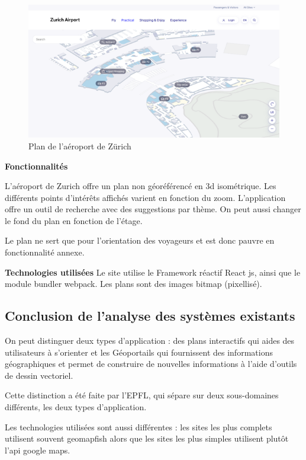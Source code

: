 \documentclass[
    iai, %
    il, %
]{heig-tb}
\begin{document}
\begin{figure}[h]
    \centering
    \includegraphics[scale=0.7]{planZurichAirport.png}
    \caption{Plan de l'aéroport de Zürich}
\end{figure}

\textbf{Fonctionnalités}

L'aéroport de Zurich \cite{zurich-aeroport} offre un plan non géoréférencé en 3d isométrique.
Les différents points d'intérêts affichés varient en fonction du zoom.
L'application offre un outil de recherche avec des suggestions par thème.
On peut aussi changer le fond du plan en fonction de l'étage.

Le plan ne sert que pour l'orientation des voyageurs et est donc pauvre en fonctionnalité annexe.

\textbf{Technologies utilisées}
Le site utilise le Framework réactif React js, ainsi que le module bundler webpack.  Les plans sont des images bitmap (pixellisé).

\subsection{Conclusion de l'analyse des systèmes existants}
On peut distinguer deux types d'application :
des plans interactifs qui aides des utilisateurs à s'orienter et les Géoportails qui fournissent des informations géographiques et permet de construire de nouvelles informations à l'aide d'outils de dessin vectoriel.

Cette distinction a été faite par l'EPFL, qui sépare sur deux sous-domaines différents, les deux types d'application.

Les technologies utilisées sont aussi différentes : les sites les plus complets utilisent souvent geomapfish alors que les sites les plus simples utilisent plutôt l'api google maps.
\end{document}
